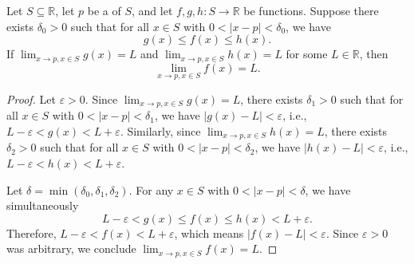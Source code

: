 \begin{theorem} \label{theorem:squeeze_theorem_for_limits_of_real_valued_functions_on_real_numbers}
    Let $S \subseteq \mathbb{R}$, let $p$ be a  of $S$, and let $f, g, h : S \to \mathbb{R}$ be functions. Suppose there exists $\delta_0 > 0$ such that for all $x \in S$ with $0 < |x - p| < \delta_0$, we have
    $$g(x) \leq f(x) \leq h(x).$$
    If $\lim_{x \to p, x \in S} g(x) = L$ and $\lim_{x \to p, x \in S} h(x) = L$ for some $L \in \mathbb{R}$, then
    $$\lim_{x \to p, x \in S} f(x) = L.$$
\end{theorem}

\begin{proof}
    Let $\varepsilon > 0$. Since $\lim_{x \to p, x \in S} g(x) = L$, there exists $\delta_1 > 0$ such that for all $x \in S$ with $0 < |x - p| < \delta_1$, we have $|g(x) - L| < \varepsilon$, i.e., $L - \varepsilon < g(x) < L + \varepsilon$. Similarly, since $\lim_{x \to p, x \in S} h(x) = L$, there exists $\delta_2 > 0$ such that for all $x \in S$ with $0 < |x - p| < \delta_2$, we have $|h(x) - L| < \varepsilon$, i.e., $L - \varepsilon < h(x) < L + \varepsilon$.

    Let $\delta = \min(\delta_0, \delta_1, \delta_2)$. For any $x \in S$ with $0 < |x - p| < \delta$, we have simultaneously
    $$L - \varepsilon < g(x) \leq f(x) \leq h(x) < L + \varepsilon.$$
    Therefore, $L - \varepsilon < f(x) < L + \varepsilon$, which means $|f(x) - L| < \varepsilon$. Since $\varepsilon > 0$ was arbitrary, we conclude $\lim_{x \to p, x \in S} f(x) = L$.
\end{proof}
